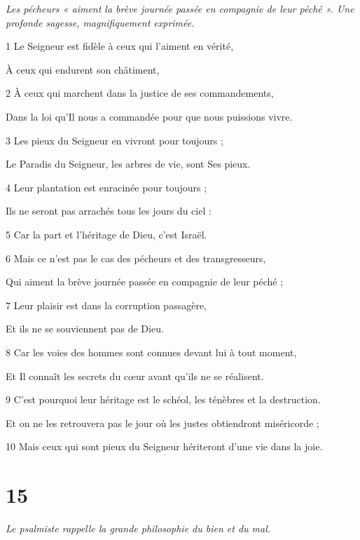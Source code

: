 \par \textit{Les pécheurs « aiment la brève journée passée en compagnie de leur péché ». Une profonde sagesse, magnifiquement exprimée.}

\par 1 Le Seigneur est fidèle à ceux qui l'aiment en vérité,
\par     À ceux qui endurent son châtiment,
\par 2 À ceux qui marchent dans la justice de ses commandements,
\par     Dans la loi qu'Il nous a commandée pour que nous puissions vivre.
\par 3 Les pieux du Seigneur en vivront pour toujours ;
\par     Le Paradis du Seigneur, les arbres de vie, sont Ses pieux.
\par 4 Leur plantation est enracinée pour toujours ;
\par     Ils ne seront pas arrachés tous les jours du ciel :
\par 5 Car la part et l'héritage de Dieu, c'est Israël.
\par 6 Mais ce n'est pas le cas des pécheurs et des transgresseurs,
\par     Qui aiment la brève journée passée en compagnie de leur péché ;
\par 7 Leur plaisir est dans la corruption passagère,
\par     Et ils ne se souviennent pas de Dieu.
\par 8 Car les voies des hommes sont connues devant lui à tout moment,
\par     Et Il connaît les secrets du cœur avant qu’ils ne se réalisent.
\par 9 C'est pourquoi leur héritage est le schéol, les ténèbres et la destruction.
\par     Et on ne les retrouvera pas le jour où les justes obtiendront miséricorde ;
\par 10 Mais ceux qui sont pieux du Seigneur hériteront d'une vie dans la joie.

\chapter{15}

\par \textit{Le psalmiste rappelle la grande philosophie du bien et du mal.}

